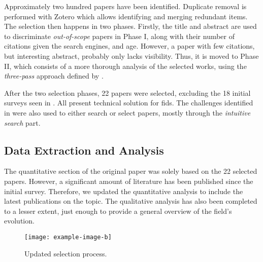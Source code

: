 Approximately two hundred papers have been identified.
Duplicate removal is performed with Zotero which allows identifying and merging redundant items.
The selection then happens in two phases.
Firstly, the title and abstract are used to discriminate \emph{out-of-scope} papers in Phase I, along with their number of citations given the search engines, and age.
However, a paper with few citations, but interesting abstract, probably only lacks visibility.
Thus, it is moved to Phase II, which consists of a more thorough analysis of the selected works, using the \emph{three-pass} approach defined by \textcite{keshav_Howreadpaper_2007}.

After the two selection phases, 22 papers were selected, excluding the 18 initial surveys seen in .
All present technical solution for \gls{fids}.
The challenges identified in  were also used to either search or select papers, mostly through the \emph{intuitive search} part.


\subsection{Data Extraction and Analysis\label{sec:sota.methodo.extraction}}

The quantitative section of the original paper was solely based on the 22 selected papers.
However, a significant amount of literature has been published since the initial survey.
Therefore, we updated the quantitative analysis to include the latest publications on the topic.
The qualitative analysis has also been completed to a lesser extent, just enough to provide a general overview of the field's evolution.


\begin{figure}
\centering
  \texttt{[image: example-image-b]}
  \caption{Updated selection process.}
  \label{fig:methodo.update}
\end{figure}




